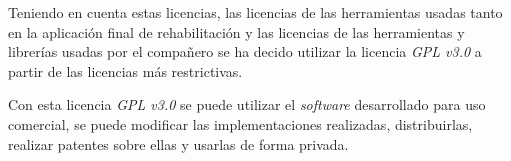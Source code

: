 Teniendo en cuenta estas licencias, las licencias de las herramientas usadas tanto en la aplicación final de rehabilitación y las licencias de las herramientas y librerías usadas por el compañero se ha decido utilizar la licencia \textit{GPL v3.0} a partir de las licencias más restrictivas.

Con esta licencia \textit{GPL v3.0} se puede utilizar el \textit{software} desarrollado para uso comercial, se puede modificar las implementaciones realizadas,  distribuirlas, realizar patentes sobre ellas y usarlas de forma privada.
